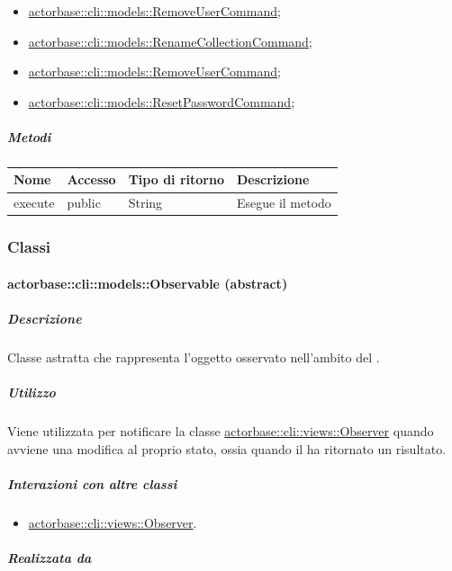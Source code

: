 \documentclass{scalatekids-article}
\begin{document}
\begin{itemize}
\item  \hyperref[sec:actorbase::cli::models::RemoveUserCommand]{actorbase::cli::models::RemoveUserCommand};
\item  \hyperref[sec:actorbase::cli::models::RenameCollectionCommand]{actorbase::cli::models::RenameCollectionCommand};
\item  \hyperref[sec:actorbase::cli::models::RemoveUserCommand]{actorbase::cli::models::RemoveUserCommand};
\item  \hyperref[sec:actorbase::cli::models::ResetPasswordCommand]{actorbase::cli::models::ResetPasswordCommand};
\end{itemize}

\subparagraph{Metodi}

\begin{tabular}{| l | l | l | l |}
  \hline
  Nome & Accesso & Tipo di ritorno & Descrizione\\
  \hline
  execute & public & String & Esegue il metodo\\
  \hline
\end{tabular}

\subsubsection{Classi}

\paragraph{actorbase::cli::models::Observable (abstract)}
\label{sec:actorbase::cli::models::Observable}

\subparagraph{Descrizione}

Classe astratta che rappresenta l'oggetto osservato nell'ambito del  .

\subparagraph{Utilizzo}

Viene utilizzata per notificare la classe \hyperref[sec:actorbase::cli::views::Observer]{actorbase::cli::views::Observer}
quando avviene una modifica al proprio stato, ossia quando il 
ha ritornato un risultato.

\subparagraph{Interazioni con altre classi}

\begin{itemize}
\item \hyperref[sec:actorbase::cli::views::Observer]{actorbase::cli::views::Observer}.
\end{itemize}

\subparagraph{Realizzata da}
\end{document}
